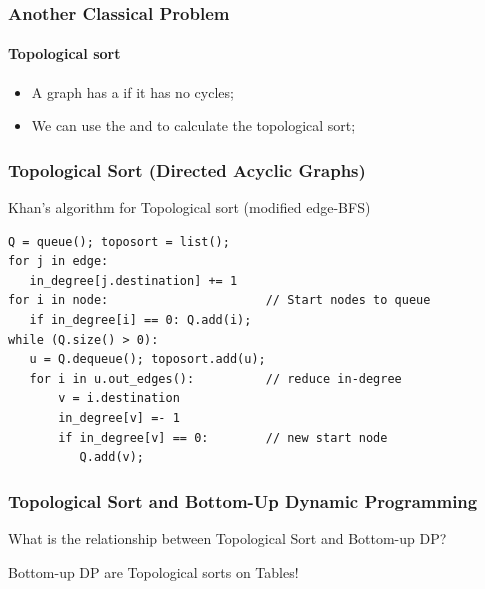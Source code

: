 \begin{frame}
  \frametitle{Another Classical Problem}
  \framesubtitle{Topological sort}

  \begin{itemize}
  \item A  graph has a  if it has \alert{no cycles};
  \item We can use the  and
     to calculate the topological sort;
  \end{itemize}

  \begin{center}
  \end{center}
\end{frame}

\begin{frame}[fragile]
  \frametitle{Topological Sort (Directed Acyclic Graphs)}

  {\smaller

    \begin{exampleblock}{Khan's algorithm for Topological sort (modified edge-BFS)}
\begin{verbatim}
Q = queue(); toposort = list();
for j in edge:
   in_degree[j.destination] += 1
for i in node:                      // Start nodes to queue
   if in_degree[i] == 0: Q.add(i);
while (Q.size() > 0):
   u = Q.dequeue(); toposort.add(u);
   for i in u.out_edges():          // reduce in-degree
       v = i.destination
       in_degree[v] =- 1
       if in_degree[v] == 0:        // new start node
          Q.add(v);
\end{verbatim}
    \end{exampleblock}
  }
\end{frame}

\begin{frame}
  \frametitle{Topological Sort and Bottom-Up Dynamic Programming}

  What is the relationship between Topological Sort and Bottom-up DP?

  \bigskip

  Bottom-up DP are Topological sorts on Tables!
\end{frame}

